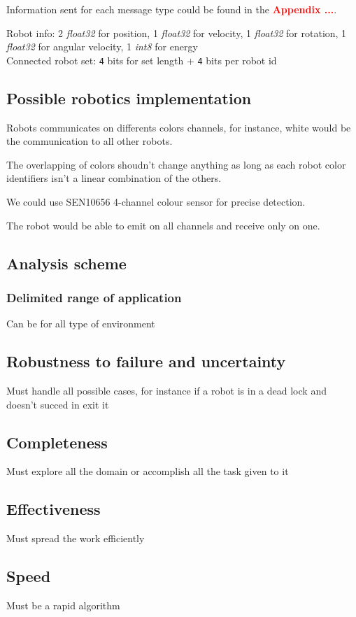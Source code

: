\documentclass[../main.tex]{subfiles}
\begin{document}
Information sent for each message type could be found in the \textcolor{red}{\textbf{Appendix ...}}.

Robot info:
2 \textit{float32} for position, 1 \textit{float32} for velocity, 1 \textit{float32} for rotation, 1 \textit{float32} for angular velocity, 1 \textit{int8} for energy\\

Connected robot set:
\texttt{4} bits for set length + \texttt{4} bits per robot id

\subsection{Possible robotics implementation}
Robots communicates on differents colors channels, for instance, white would be the communication to all other robots.

The overlapping of colors shoudn't change anything as long as each robot color identifiers isn't a linear combination of the others.

We could use SEN10656 4-channel colour sensor for precise detection.

The robot would be able to emit on all channels and receive only on one.


\subsection{Analysis scheme}

\subsubsection{Delimited range of application}
Can be for all type of environment

\subsection{Robustness to failure and uncertainty}
Must handle all possible cases, for instance if a robot is in a dead lock and doesn't succed in exit it

\subsection{Completeness}
Must explore all the domain or accomplish all the task given to it

\subsection{Effectiveness}
Must spread the work efficiently

\subsection{Speed}
Must be a rapid algorithm
\end{document}
